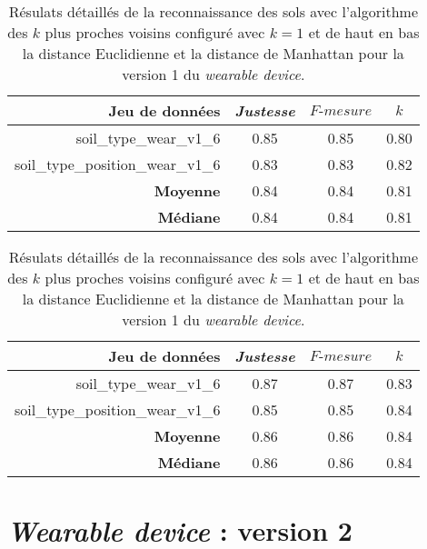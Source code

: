 \begin{table}[H]\renewcommand{\arraystretch}{0.5}
	\centering
	\caption{Résulats détaillés de la reconnaissance des sols avec l'algorithme des $k$ plus proches voisins configuré avec $k=1$ et de haut en bas la distance Euclidienne et la distance de Manhattan pour la version 1 du \textit{wearable device}.}
	\label{tab:knn-wear-v1}
	\begin{tabular}{@{}rccc@{}}
		\toprule
			\textbf{Jeu de données} & \textit{Justesse} & $F\mbox{-} mesure$ & \textbf{$k$} \\
		\midrule
			soil\_type\_wear\_v1\_6 & 0.85 & 0.85 & 0.80 \\
			soil\_type\_position\_wear\_v1\_6 & 0.83 & 0.83 & 0.82 \\
			\textbf{Moyenne} & 0.84 & 0.84 & 0.81 \\
			\textbf{Médiane} & 0.84 & 0.84 & 0.81 \\
	\end{tabular}
	\begin{tabular}{@{}rccc@{}}
		\toprule
			\textbf{Jeu de données} & \textit{Justesse} & $F\mbox{-} mesure$ & \textbf{$k$} \\
		\midrule
			soil\_type\_wear\_v1\_6 & 0.87 & 0.87 & 0.83 \\
			soil\_type\_position\_wear\_v1\_6 & 0.85 & 0.85 & 0.84 \\
			\textbf{Moyenne} & 0.86 & 0.86 & 0.84 \\
			\textbf{Médiane} & 0.86 & 0.86 & 0.84 \\
		\bottomrule
	\end{tabular}
\end{table}

\section{\textit{Wearable device} : version 2}

